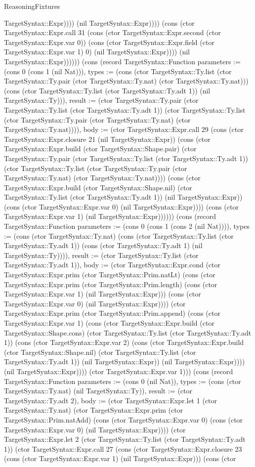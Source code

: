 \begin{lexlean}{ReasoningFixtures}
\begin{semanticmodule}
{TargetSyntax::Expr)))) (nil TargetSyntax::Expr)))) (cons (ctor TargetSyntax::Expr.call 31 (cons (ctor TargetSyntax::Expr.second (ctor TargetSyntax::Expr.var 0)) (cons (ctor TargetSyntax::Expr.field (ctor TargetSyntax::Expr.var 1) 0) (nil TargetSyntax::Expr)))) (nil TargetSyntax::Expr)))))}) (cons (record TargetSyntax::Function {parameters := (cons 0 (cons 1 (nil Nat))), types := (cons (ctor TargetSyntax::Ty.list (ctor TargetSyntax::Ty.pair (ctor TargetSyntax::Ty.nat) (ctor TargetSyntax::Ty.nat))) (cons (ctor TargetSyntax::Ty.list (ctor TargetSyntax::Ty.adt 1)) (nil TargetSyntax::Ty))), result := (ctor TargetSyntax::Ty.pair (ctor TargetSyntax::Ty.list (ctor TargetSyntax::Ty.adt 1)) (ctor TargetSyntax::Ty.list (ctor TargetSyntax::Ty.pair (ctor TargetSyntax::Ty.nat) (ctor TargetSyntax::Ty.nat)))), body := (ctor TargetSyntax::Expr.call 29 (cons (ctor TargetSyntax::Expr.closure 21 (nil TargetSyntax::Expr)) (cons (ctor TargetSyntax::Expr.build (ctor TargetSyntax::Shape.pair) (ctor TargetSyntax::Ty.pair (ctor TargetSyntax::Ty.list (ctor TargetSyntax::Ty.adt 1)) (ctor TargetSyntax::Ty.list (ctor TargetSyntax::Ty.pair (ctor TargetSyntax::Ty.nat) (ctor TargetSyntax::Ty.nat)))) (cons (ctor TargetSyntax::Expr.build (ctor TargetSyntax::Shape.nil) (ctor TargetSyntax::Ty.list (ctor TargetSyntax::Ty.adt 1)) (nil TargetSyntax::Expr)) (cons (ctor TargetSyntax::Expr.var 0) (nil TargetSyntax::Expr)))) (cons (ctor TargetSyntax::Expr.var 1) (nil TargetSyntax::Expr)))))}) (cons (record TargetSyntax::Function {parameters := (cons 0 (cons 1 (cons 2 (nil Nat)))), types := (cons (ctor TargetSyntax::Ty.nat) (cons (ctor TargetSyntax::Ty.list (ctor TargetSyntax::Ty.adt 1)) (cons (ctor TargetSyntax::Ty.adt 1) (nil TargetSyntax::Ty)))), result := (ctor TargetSyntax::Ty.list (ctor TargetSyntax::Ty.adt 1)), body := (ctor TargetSyntax::Expr.cond (ctor TargetSyntax::Expr.prim (ctor TargetSyntax::Prim.natLt) (cons (ctor TargetSyntax::Expr.prim (ctor TargetSyntax::Prim.length) (cons (ctor TargetSyntax::Expr.var 1) (nil TargetSyntax::Expr))) (cons (ctor TargetSyntax::Expr.var 0) (nil TargetSyntax::Expr)))) (ctor TargetSyntax::Expr.prim (ctor TargetSyntax::Prim.append) (cons (ctor TargetSyntax::Expr.var 1) (cons (ctor TargetSyntax::Expr.build (ctor TargetSyntax::Shape.cons) (ctor TargetSyntax::Ty.list (ctor TargetSyntax::Ty.adt 1)) (cons (ctor TargetSyntax::Expr.var 2) (cons (ctor TargetSyntax::Expr.build (ctor TargetSyntax::Shape.nil) (ctor TargetSyntax::Ty.list (ctor TargetSyntax::Ty.adt 1)) (nil TargetSyntax::Expr)) (nil TargetSyntax::Expr)))) (nil TargetSyntax::Expr)))) (ctor TargetSyntax::Expr.var 1))}) (cons (record TargetSyntax::Function {parameters := (cons 0 (nil Nat)), types := (cons (ctor TargetSyntax::Ty.nat) (nil TargetSyntax::Ty)), result := (ctor TargetSyntax::Ty.adt 2), body := (ctor TargetSyntax::Expr.let 1 (ctor TargetSyntax::Ty.nat) (ctor TargetSyntax::Expr.prim (ctor TargetSyntax::Prim.natAdd) (cons (ctor TargetSyntax::Expr.var 0) (cons (ctor TargetSyntax::Expr.var 0) (nil TargetSyntax::Expr)))) (ctor TargetSyntax::Expr.let 2 (ctor TargetSyntax::Ty.list (ctor TargetSyntax::Ty.adt 1)) (ctor TargetSyntax::Expr.call 27 (cons (ctor TargetSyntax::Expr.closure 23 (cons (ctor TargetSyntax::Expr.var 1) (nil TargetSyntax::Expr))) (cons (ctor }
\end{semanticmodule}
\end{lexlean}
